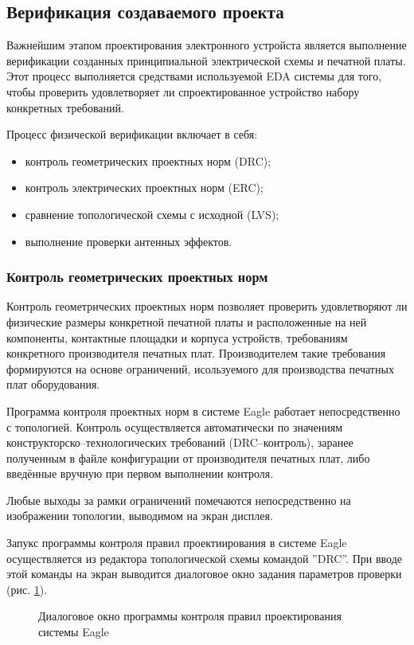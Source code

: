 \subsection{Верификация создаваемого проекта}
Важнейшим этапом проектирования электронного устройста является выполнение
верификации созданных принципиальной электрической схемы и печатной платы.
Этот процесс выполняется средствами используемой EDA системы
для того, чтобы проверить удовлетворяет ли спроектированное устройство набору
конкретных требований.

Процесс физической верификации включает в себя:
\begin{itemize}
	\item{} контроль геометрических проектных норм (DRC);
	\item{} контроль электрических проектных норм (ERC);
	\item{} сравнение топологической схемы с исходной (LVS);
	\item{} выполнение проверки антенных эффектов.
\end{itemize}


\subsubsection{Контроль геометрических проектных норм}
Контроль геометрических проектных норм позволяет проверить удовлетворяют ли физические
размеры конкретной печатной платы и расположенные на ней компоненты, контактные
площадки и корпуса устройств, требованиям конкретного производителя печатных плат.
Производителем такие требования формируются на основе ограничений, исользуемого для
производства печатных плат оборудования.

Программа контроля проектных норм в системе Eagle работает непосредственно с топологией.
Контроль осуществляется автоматически по значениям конструкторско--технологических
требований (DRC--контроль), заранее полученным в файле конфигурации от производителя
печатных плат, либо введённые вручную при первом выполнении контроля.

Любые выходы за рамки ограничений помечаются непосредственно на изображении топологии,
выводимом на экран дисплея.

Запукс программы контроля правил проектиирования в системе Eagle осуществляется из
редактора топологической схемы командой ''DRC''.  При вводе этой команды на экран
выводится диалоговое окно задания параметров проверки (рис. \ref{img:drc}).
\begin{figure}[ht]
	\caption{Диалоговое окно программы контроля правил проектирования системы Eagle}
	\label{img:drc}
\end{figure}

